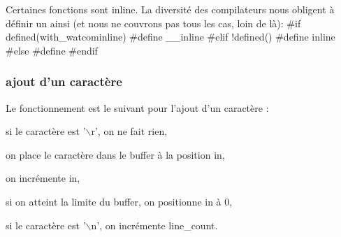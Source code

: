 \documentclass{scrartcl}%
\begin{document}
\eatline
{}\nwendcode{}Certaines fonctions sont {\Tt{}inline\nwendquote}. La diversité des compilateurs nous obligent à définir un {\Tt{}\nwendquote} ainsi (et nous ne couvrons pas tous les cas, loin de là):
\nwenddocs{}\endmoddef\nwstartdeflinemarkup{}\nwenddeflinemarkup
#if defined(with_watcominline)
        #define  __inline
#elif !defined()
        #define  inline
#else
        #define 
#endif
\eatline
{}\nwendcode{}\subsubsection{ajout d'un caractère}
Le fonctionnement est le suivant pour l'ajout d'un caractère :

\begin{packed_itemize}
  \item si le caractère est '$\backslash$r', on ne fait rien,
  \item on place le caractère dans le buffer à la position {\Tt{}in\nwendquote},
  \item on incrémente {\Tt{}in\nwendquote},
  \item si on atteint la limite du buffer, on positionne {\Tt{}in\nwendquote} à 0,
  \item si le caractère est '$\backslash$n', on incrémente {\Tt{}line{\_}count\nwendquote}.
\end{packed_itemize}
\end{document}
